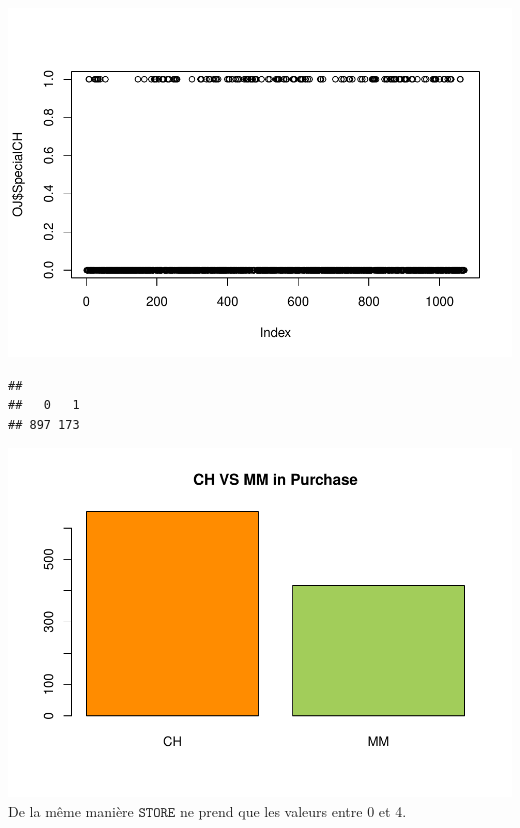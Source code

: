\documentclass[
]{article}
\newenvironment{Shaded}{\begin{snugshade}}{\end{snugshade}}
\newcommand{\KeywordTok}[1]{\textcolor[rgb]{0.13,0.29,0.53}{\textbf{#1}}}
\newcommand{\NormalTok}[1]{#1}
\newcommand{\OperatorTok}[1]{\textcolor[rgb]{0.81,0.36,0.00}{\textbf{#1}}}
\begin{document}
\begin{Shaded}
\end{Shaded}

\includegraphics{durand_eltarr_files/figure-latex/unnamed-chunk-3-1.pdf}

\begin{Shaded}
\end{Shaded}

\begin{verbatim}
## 
##   0   1 
## 897 173
\end{verbatim}

\begin{Shaded}
\end{Shaded}

\includegraphics{durand_eltarr_files/figure-latex/unnamed-chunk-4-1.pdf}
De la même manière \(\texttt{STORE}\) ne prend que les valeurs entre 0
et 4.
\end{document}
